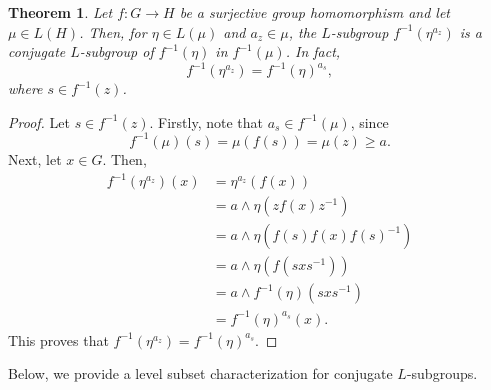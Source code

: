 \documentclass[10pt]{article}
\theoremstyle{plain}
\newtheorem{theorem}{Theorem}[section]
\theoremstyle{definition}
\theoremstyle{remark}
\theoremstyle{case}
\begin{document}
\begin{theorem}\label{hom_conj2}
	Let $f: G \rightarrow H$ be a surjective group homomorphism and let $\mu \in L(H)$. Then, for $\eta \in L(\mu)$ and $a_z \in \mu$, the $L$-subgroup $f^{-1}(\eta^{a_z})$ is a conjugate $L$-subgroup of $f^{-1}(\eta)$ in $f^{-1}(\mu)$. In fact, 
	\[ f^{-1}(\eta^{a_z}) = f^{-1}(\eta)^{a_s},  \]
	where $s \in f^{-1}(z)$. 
\end{theorem}
\begin{proof}
	Let $s \in f^{-1}(z)$. Firstly, note that $a_s \in f^{-1}(\mu)$, since
	\[ f^{-1}(\mu)(s) = \mu(f(s)) = \mu(z) \geq a. \]
	Next, let $x \in G$. Then, 
	\begin{equation*}
		\begin{split}
			f^{-1}(\eta^{a_z})(x) &= \eta^{a_z}(f(x))\\
			&= a \wedge \eta(zf(x)z^{-1}) \\
			&= a \wedge \eta(f(s) f(x) f(s)^{-1})\\
			&= a \wedge \eta(f(sxs^{-1})) \\
			&= a \wedge f^{-1}(\eta)(sxs^{-1}) \\
			&= f^{-1}(\eta)^{a_s}(x).
		\end{split}
	\end{equation*}
This proves that $f^{-1}(\eta^{a_z}) = f^{-1}(\eta)^{a_s}$.
\end{proof}

\noindent Below, we provide a level subset characterization for conjugate $L$-subgroups.
\end{document}
